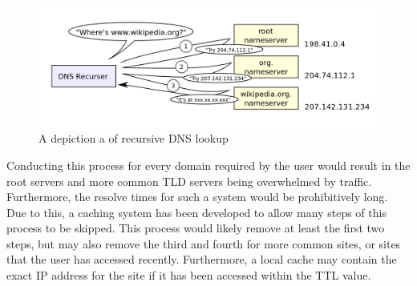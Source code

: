 \documentclass[a4paper,11pt]{report}
\begin{document}
			\begin{figure}[htb]
				\centering
					\includegraphics[scale=0.27]{./DNSRecursor.png}
					\caption{A depiction a of recursive DNS lookup}
					\label{fig:DNSRecursor}
			\end{figure}

			Conducting this process for every domain required by the user would result in the root servers and more common TLD servers being overwhelmed by traffic. 
			Furthermore, the resolve times for such a system would be prohibitively long. 
			Due to this, a caching system has been developed to allow many steps of this process to be skipped. 
			This process would likely remove at least the first two steps, but may also remove the third and fourth for more common sites, or sites that the user has accessed recently. 
			Furthermore, a local cache may contain the exact IP address for the site if it has been accessed within the TTL value. 
\end{document}
